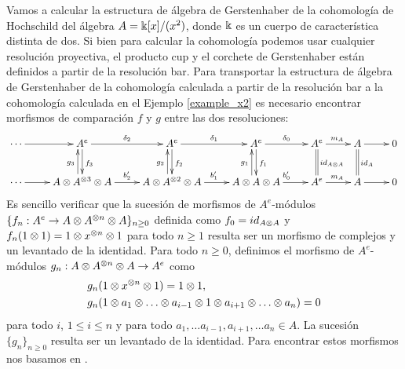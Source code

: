 \documentclass[a4paper,oneside,fleqn,11pt,../tesis.tex]{subfiles}
\begin{document}
\begin{example}
	Vamos a calcular la estructura de álgebra de Gerstenhaber de la cohomología de Hochschild del álgebra $A = \Bbbk[x]/(x^2)$, donde
	$\Bbbk$ es un cuerpo de característica distinta de dos. Si bien para calcular la cohomología podemos usar cualquier resolución proyectiva,
	el producto cup y el corchete de Gerstenhaber están definidos a partir de la resolución bar. Para transportar la estructura de álgebra
	de Gerstenhaber de la cohomología calculada a partir de la resolución bar a la cohomología calculada en el Ejemplo \ref{example_x2}
	es necesario encontrar morfismos de comparación $f$ y $g$ entre las dos resoluciones:
	\begin{align*}
		\xymatrix{
			\cdots \ar[r] &  A^e \ar[r]^{\delta_2} \ar[d]^{f_3} & A^e \ar[r]^{\delta_1} \ar[d]^{f_2}
				& A^e \ar[r]^{\delta_0} \ar[d]^{f_1} & A^e \ar[r]^{m_A} \ar@{=}[d]^{id_{A\ox A}} & A \ar[r] \ar@{=}[d]^{id_A} & 0\\
			\cdots \ar[r] & A \ox A^{\ox 3} \ox A \ar[r]^{b_2'} \ar@<1ex>[u]^{g_3} & A \ox A^{\ox 2} \ox A \ar[r]^{b_1'} \ar@<1ex>[u]^{g_2}
				& A \ox A \ox A \ar[r]^{b_0'} \ar@<1ex>[u]^{g_1} & A^e \ar[r]^{m_A} & A \ar[r] & 0\\
		}
	\end{align*}
	Es sencillo verificar que la sucesión de morfismos de $A^e$-módulos $\lbrace f_{n}: A^e \to A\otimes A^{\otimes n} \otimes A\rbrace_{n \geq 0}$ definida como
	$f_0 = id_{A\otimes A}$ y $f_n(1\otimes 1) = 1 \otimes x^{\otimes n} \otimes 1$ para todo $n \geq 1$ resulta ser un morfismo de complejos
	y un levantado de la identidad. Para todo $n \geq 0$, definimos el morfismo de $A^e$-módulos $g_n: A \otimes A^{\otimes n} \otimes A \to A^e$ como
	\begin{align*}
		&g_n(1\otimes x^{\otimes n}\otimes 1) = 1\otimes 1,\\
		&g_n(1\otimes a_1 \otimes \ldots \otimes a_{i - 1} \otimes 1 \otimes a_{i + 1}\otimes \ldots \otimes a_n) = 0
	\end{align*}
	para todo $i$, $1 \leq i \leq n$ y para todo $a_1, \ldots a_{i - 1}, a_{i + 1}, \ldots a_n \in A$.
 	La sucesión $\lbrace g_n \rbrace_{n \geq 0}$ resulta ser un levantado de la identidad. Para encontrar estos morfismos
	nos basamos en \cite{GGRSV}.
	

\end{example}
\end{document}
